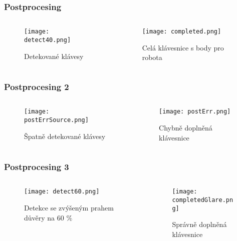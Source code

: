 \begin{frame}
   \frametitle{Postprocesing}
   \begin{columns}[t, onlytextwidth]
      \begin{column}[T]{0.5\textwidth}
         \begin{figure}[h]
         		\centering
         		\texttt{[image: detect40.png]}
			\caption{Detekované klávesy}
		\end{figure}
      \end{column}
      \begin{column}[T]{0.50\textwidth}
		\begin{figure}[h]
         		\centering
         		\texttt{[image: completed.png]}
			\caption{Celá klávesnice s body pro robota}
		\end{figure}
      \end{column}
   \end{columns}
\end{frame}

\begin{frame}
   \frametitle{Postprocesing 2}
   \begin{columns}[t, onlytextwidth]
      \begin{column}[T]{0.5\textwidth}
         \begin{figure}[h]
         		\centering
         		\texttt{[image: postErrSource.png]}
			\caption{Špatně detekované klávesy}
		\end{figure}
      \end{column}
      \begin{column}[T]{0.50\textwidth}
		\begin{figure}[h]
         		\centering
         		\texttt{[image: postErr.png]}
			\caption{Chybně doplněná klávesnice}
		\end{figure}
      \end{column}
   \end{columns}
\end{frame}

\begin{frame}
   \frametitle{Postprocesing 3}
   \begin{columns}[t, onlytextwidth]
      \begin{column}[T]{0.5\textwidth}
         \begin{figure}[h]
         		\centering
         		\texttt{[image: detect60.png]}
			\caption{Detekce se zvýšeným prahem důvěry na 60 \%}
		\end{figure}
      \end{column}
      \begin{column}[T]{0.50\textwidth}
		\begin{figure}[h]
         		\centering
         		\texttt{[image: completedGlare.png]}
			\caption{Správně doplněná klávesnice}
		\end{figure}
      \end{column}
   \end{columns}
\end{frame}


